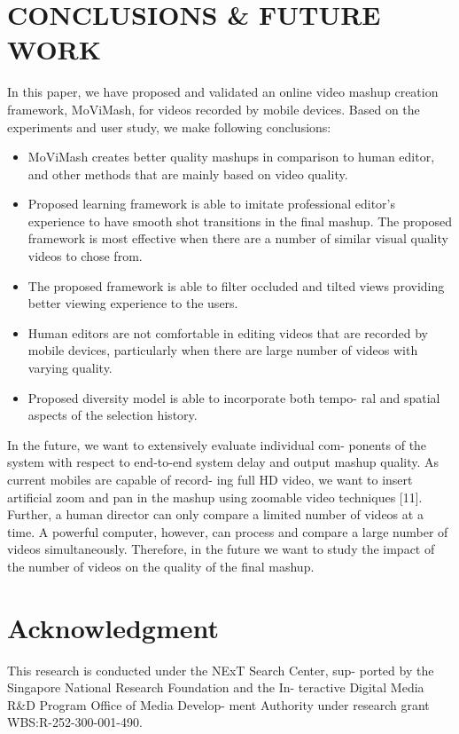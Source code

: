 \documentclass{sig-alternate}
\begin{document}
\section{CONCLUSIONS \& FUTURE WORK}
In this paper, we have proposed and validated an online video
mashup creation framework, MoViMash, for videos recorded by
mobile devices. Based on the experiments and user study, we make
following conclusions:
\begin{itemize}
    \item MoViMash creates better quality mashups in comparison to
human editor, and other methods that are mainly based on
video quality.
    \item Proposed learning framework is able to imitate professional
editor’s experience to have smooth shot transitions in the final mashup. The proposed framework is most effective when there are a number of similar visual quality videos to chose
from.
    \item The proposed framework is able to filter occluded and tilted
views providing better viewing experience to the users.
    \item Human editors are not comfortable in editing videos that are
recorded by mobile devices, particularly when there are large
number of videos with varying quality.
    \item Proposed diversity model is able to incorporate both tempo-
ral and spatial aspects of the selection history.
\end{itemize}
In the future, we want to extensively evaluate individual com-
ponents of the system with respect to end-to-end system delay and
output mashup quality. As current mobiles are capable of record-
ing full HD video, we want to insert artificial zoom and pan in the
mashup using zoomable video techniques [11]. Further, a human
director can only compare a limited number of videos at a time.
A powerful computer, however, can process and compare a large
number of videos simultaneously. Therefore, in the future we want
to study the impact of the number of videos on the quality of the
final mashup.
\section{Acknowledgment}
This research is conducted under the NExT Search Center, sup-
ported by the Singapore National Research Foundation and the In-
teractive Digital Media R\&D Program Office of Media Develop-
ment Authority under research grant WBS:R-252-300-001-490.
\end{document}
